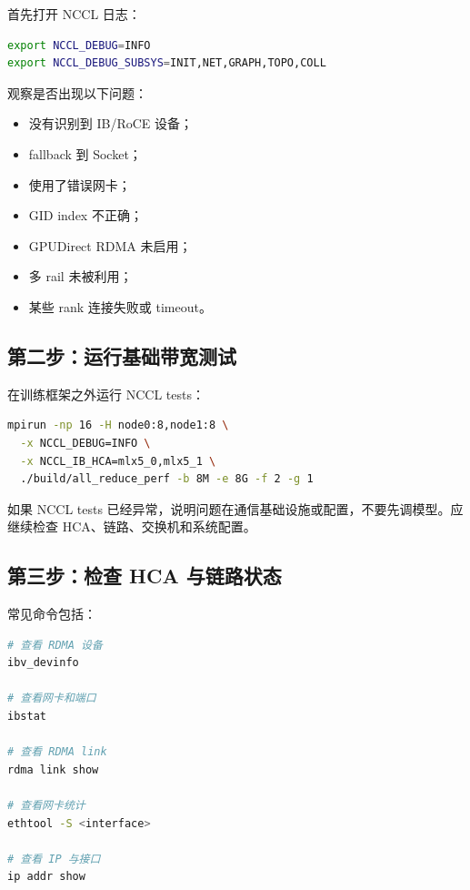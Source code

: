 首先打开 NCCL 日志：

\begin{lstlisting}[language=bash,caption={打开 NCCL 网络调试日志},label={lst:nccl-net-debug}]
export NCCL_DEBUG=INFO
export NCCL_DEBUG_SUBSYS=INIT,NET,GRAPH,TOPO,COLL
\end{lstlisting}

观察是否出现以下问题：

\begin{itemize}
  \item 没有识别到 IB/RoCE 设备；
  \item fallback 到 Socket；
  \item 使用了错误网卡；
  \item GID index 不正确；
  \item GPUDirect RDMA 未启用；
  \item 多 rail 未被利用；
  \item 某些 rank 连接失败或 timeout。
\end{itemize}

\subsection{第二步：运行基础带宽测试}
\label{subsec:debug-bandwidth-test}

在训练框架之外运行 NCCL tests：

\begin{lstlisting}[language=bash,caption={多节点 NCCL all-reduce 基线测试},label={lst:multi-node-nccl-baseline}]
mpirun -np 16 -H node0:8,node1:8 \
  -x NCCL_DEBUG=INFO \
  -x NCCL_IB_HCA=mlx5_0,mlx5_1 \
  ./build/all_reduce_perf -b 8M -e 8G -f 2 -g 1
\end{lstlisting}

如果 NCCL tests 已经异常，说明问题在通信基础设施或配置，不要先调模型。应继续检查 HCA、链路、交换机和系统配置。

\subsection{第三步：检查 HCA 与链路状态}
\label{subsec:debug-hca-link}

常见命令包括：

\begin{lstlisting}[language=bash,caption={检查 RDMA 设备和链路状态的常用命令},label={lst:rdma-link-check}]
# 查看 RDMA 设备
ibv_devinfo

# 查看网卡和端口
ibstat

# 查看 RDMA link
rdma link show

# 查看网卡统计
ethtool -S <interface>

# 查看 IP 与接口
ip addr show
\end{lstlisting}

